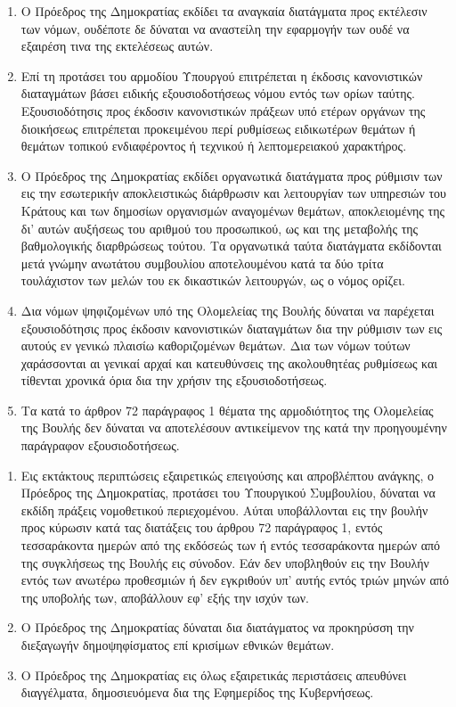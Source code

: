 \documentclass[twoside, a4paper, 10pt]{article}
\begin{document}
\begin{multicols}{2}
\begin{enumerate}
\begin{BigQuote}
\begin{enumerate}
  \item[1.] O Πρόεδρος της Δημοκρατίας εκδίδει τα αναγκαία διατάγματα προς εκτέλεσιν των νόμων, ουδέποτε δε δύναται να αναστείλη την εφαρμογήν των ουδέ να εξαιρέση τινα της εκτελέσεως αυτών.
  \item[2.] Επί τη προτάσει του αρμοδίου Υπουργού επιτρέπεται η έκδοσις κανονιστικών διαταγμάτων βάσει ειδικής εξουσιοδοτήσεως νόμου εντός των ορίων ταύτης. Εξουσιοδότησις προς έκδοσιν κανονιστικών πράξεων υπό ετέρων οργάνων της διοικήσεως επιτρέπεται προκειμένου περί ρυθμίσεως ειδικωτέρων θεμάτων ή θεμάτων τοπικού ενδιαφέροντος ή τεχνικού ή λεπτομερειακού χαρακτήρος.
  \item[3.] Ο Πρόεδρος της Δημοκρατίας εκδίδει οργανωτικά διατάγματα προς ρύθμισιν των εις την εσωτερικήν αποκλειστικώς διάρθρωσιν και λειτουργίαν των υπηρεσιών του Κράτους και των δημοσίων οργανισμών αναγομένων θεμάτων, αποκλειομένης της δι' αυτών αυξήσεως του αριθμού του προσωπικού, ως και της μεταβολής της βαθμολογικής διαρθρώσεως τούτου. Τα οργανωτικά ταύτα διατάγματα εκδίδονται μετά γνώμην ανωτάτου συμβουλίου αποτελουμένου  κατά τα δύο τρίτα τουλάχιστον των μελών του εκ δικαστικών λειτουργών, ως ο νόμος ορίζει.
  \item[4.] Δια νόμων ψηφιζομένων υπό της Ολομελείας της Βουλής δύναται να παρέχεται εξουσιοδότησις προς έκδοσιν κανονιστικών διαταγμάτων δια την ρύθμισιν των εις αυτούς εν γενικώ πλαισίω καθοριζομένων θεμάτων. Δια των νόμων τούτων χαράσσονται αι γενικαί αρχαί και κατευθύνσεις της ακολουθητέας ρυθμίσεως και τίθενται χρονικά όρια δια την χρήσιν της εξουσιοδοτήσεως.
  \item[5.] Τα κατά το άρθρον 72 παράγραφος 1 θέματα της αρμοδιότητος της Ολομελείας της Βουλής δεν δύναται να αποτελέσουν αντικείμενον της κατά την προηγουμένην παράγραφον εξουσιοδοτήσεως.
\end{enumerate}

\begin{enumerate}
  \item[1.] Εις εκτάκτους περιπτώσεις εξαιρετικώς επειγούσης και απροβλέπτου ανάγκης, ο Πρόεδρος της Δημοκρατίας, προτάσει του Υπουργικού Συμβουλίου, δύναται να εκδίδη πράξεις νομοθετικού περιεχομένου. Αύται υποβάλλονται εις την βουλήν προς κύρωσιν κατά τας διατάξεις του άρθρου 72 παράγραφος 1, εντός τεσσαράκοντα ημερών από της εκδόσεώς των ή εντός τεσσαράκοντα ημερών από της συγκλήσεως της Βουλής εις σύνοδον. Εάν δεν υποβληθούν εις την Βουλήν εντός των ανωτέρω προθεσμιών ή δεν εγκριθούν υπ' αυτής εντός τριών μηνών από της υποβολής των, αποβάλλουν εφ' εξής την ισχύν των.
  \item[2.] Ο Πρόεδρος της Δημοκρατίας δύναται δια διατάγματος να προκηρύσση την διεξαγωγήν δημοψηφίσματος επί κρισίμων εθνικών θεμάτων.
  \item[3.] Ο Πρόεδρος της Δημοκρατίας εις όλως εξαιρετικάς περιστάσεις απευθύνει διαγγέλματα, δημοσιευόμενα δια της Εφημερίδος της Κυβερνήσεως.
\end{enumerate}


\end{BigQuote}
\end{enumerate}
\end{multicols}
\end{document}
